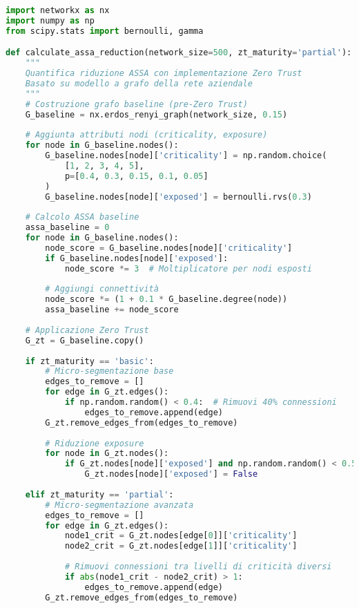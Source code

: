 \begin{lstlisting}[language=Python, caption=Calcolo Riduzione Superficie di Attacco]
import networkx as nx
import numpy as np
from scipy.stats import bernoulli, gamma

def calculate_assa_reduction(network_size=500, zt_maturity='partial'):
    """
    Quantifica riduzione ASSA con implementazione Zero Trust
    Basato su modello a grafo della rete aziendale
    """
    # Costruzione grafo baseline (pre-Zero Trust)
    G_baseline = nx.erdos_renyi_graph(network_size, 0.15)
    
    # Aggiunta attributi nodi (criticality, exposure)
    for node in G_baseline.nodes():
        G_baseline.nodes[node]['criticality'] = np.random.choice(
            [1, 2, 3, 4, 5], 
            p=[0.4, 0.3, 0.15, 0.1, 0.05]
        )
        G_baseline.nodes[node]['exposed'] = bernoulli.rvs(0.3)
    
    # Calcolo ASSA baseline
    assa_baseline = 0
    for node in G_baseline.nodes():
        node_score = G_baseline.nodes[node]['criticality']
        if G_baseline.nodes[node]['exposed']:
            node_score *= 3  # Moltiplicatore per nodi esposti
        
        # Aggiungi connettività
        node_score *= (1 + 0.1 * G_baseline.degree(node))
        assa_baseline += node_score
    
    # Applicazione Zero Trust
    G_zt = G_baseline.copy()
    
    if zt_maturity == 'basic':
        # Micro-segmentazione base
        edges_to_remove = []
        for edge in G_zt.edges():
            if np.random.random() < 0.4:  # Rimuovi 40% connessioni
                edges_to_remove.append(edge)
        G_zt.remove_edges_from(edges_to_remove)
        
        # Riduzione exposure
        for node in G_zt.nodes():
            if G_zt.nodes[node]['exposed'] and np.random.random() < 0.5:
                G_zt.nodes[node]['exposed'] = False
    
    elif zt_maturity == 'partial':
        # Micro-segmentazione avanzata
        edges_to_remove = []
        for edge in G_zt.edges():
            node1_crit = G_zt.nodes[edge[0]]['criticality']
            node2_crit = G_zt.nodes[edge[1]]['criticality']
            
            # Rimuovi connessioni tra livelli di criticità diversi
            if abs(node1_crit - node2_crit) > 1:
                edges_to_remove.append(edge)
        G_zt.remove_edges_from(edges_to_remove)
        

\end{lstlisting}
